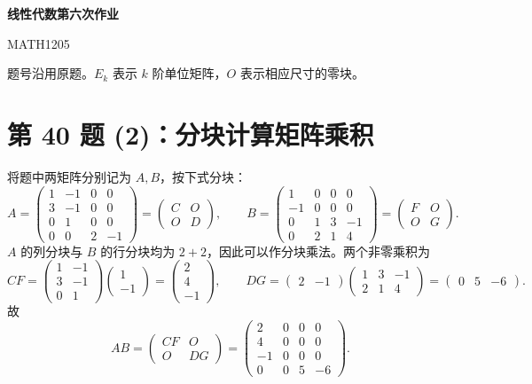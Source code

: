 \documentclass[11pt,a4paper,fontset=fandol]{ctexart}
\newcommand{\ans}[1]{\boxed{#1}}
\newcommand{\problem}[1]{\Needspace{8\baselineskip}\section*{#1}}
\begin{document}
\begin{center}
{\LARGE\bfseries 线性代数第六次作业}\par
\vspace{0.3em}
{\small MATH1205}
\end{center}
\vspace{-0.4em}
题号沿用原题。$E_k$ 表示 $k$ 阶单位矩阵，$O$ 表示相应尺寸的零块。

\problem{第 40 题 (2)：分块计算矩阵乘积}
将题中两矩阵分别记为 $A,B$，按下式分块：
\[
A=\left(\begin{array}{cc|cc}
1&-1&0&0\\
3&-1&0&0\\
0&1&0&0\\ \hline
0&0&2&-1
\end{array}\right)
=\begin{pmatrix}C&O\\O&D\end{pmatrix},\qquad
B=\left(\begin{array}{c|ccc}
1&0&0&0\\
-1&0&0&0\\ \hline
0&1&3&-1\\
0&2&1&4
\end{array}\right)
=\begin{pmatrix}F&O\\O&G\end{pmatrix}.
\]
$A$ 的列分块与 $B$ 的行分块均为 $2+2$，因此可以作分块乘法。两个非零乘积为
\[
CF=\begin{pmatrix}1&-1\\3&-1\\0&1\end{pmatrix}
\begin{pmatrix}1\\-1\end{pmatrix}
=\begin{pmatrix}2\\4\\-1\end{pmatrix},\qquad
DG=\begin{pmatrix}2&-1\end{pmatrix}
\begin{pmatrix}1&3&-1\\2&1&4\end{pmatrix}
=\begin{pmatrix}0&5&-6\end{pmatrix}.
\]
故
\[
\ans{AB=\begin{pmatrix}CF&O\\O&DG\end{pmatrix}
=\begin{pmatrix}
2&0&0&0\\4&0&0&0\\-1&0&0&0\\0&0&5&-6
\end{pmatrix}}.
\]
\end{document}

